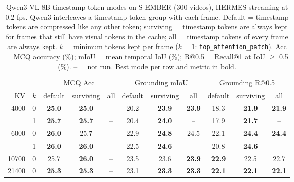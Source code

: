 \begin{table}[t]
\centering
\small
\caption{Qwen3-VL-8B timestamp-token modes on S-EMBER (300 videos), HERMES streaming at 0.2 fps. Qwen3 interleaves a timestamp token group with each frame. Default = timestamp tokens are compressed like any other token; surviving = timestamp tokens are always kept for frames that still have visual tokens in the cache; all = timestamp tokens of every frame are always kept. $k$ = minimum tokens kept per frame ($k{=}1$: \texttt{top\_attention\_patch}). Acc = MCQ accuracy (\%); mIoU = mean temporal IoU (\%); R@0.5 = Recall@1 at IoU $\geq$ 0.5 (\%). -- = not run. Best mode per row and metric in bold.}
\label{tab:sember-qwen3-timestamps-v300}
\begin{tabular}{rcccccccccc}
\toprule
& & \multicolumn{3}{c}{MCQ Acc} & \multicolumn{3}{c}{Grounding mIoU} & \multicolumn{3}{c}{Grounding R@0.5} \\
\cmidrule(lr){3-5}\cmidrule(lr){6-8}\cmidrule(lr){9-11}
KV & $k$ & default & surviving & all & default & surviving & all & default & surviving & all \\
\midrule
4000 & 0 & \textbf{25.0} & \textbf{25.0} & -- & 20.2 & \textbf{23.9} & \textbf{23.9} & 18.3 & \textbf{21.9} & \textbf{21.9} \\
 & 1 & \textbf{25.7} & \textbf{25.7} & -- & 20.4 & \textbf{24.0} & -- & 17.9 & \textbf{21.7} & -- \\
\midrule
6000 & 0 & \textbf{26.0} & 25.7 & -- & 22.9 & \textbf{24.8} & 24.5 & 22.1 & \textbf{24.4} & \textbf{24.4} \\
 & 1 & \textbf{26.0} & \textbf{26.0} & -- & 22.5 & \textbf{24.6} & -- & 20.8 & \textbf{24.6} & -- \\
\midrule
10700 & 0 & 25.7 & \textbf{26.0} & -- & 23.5 & 23.6 & \textbf{23.9} & \textbf{22.9} & 22.5 & 22.7 \\
\midrule
21400 & 0 & \textbf{25.3} & \textbf{25.3} & -- & 23.1 & \textbf{23.3} & \textbf{23.3} & \textbf{22.1} & \textbf{22.1} & \textbf{22.1} \\
\bottomrule
\end{tabular}
\end{table}
